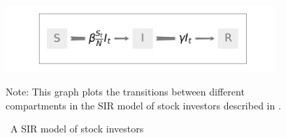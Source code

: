 	\begin{figure}[!ht] \centering  %
		\caption{ ~A SIR model of stock investors}
		\label{fig:sir_diagram}
		\centerline{\includegraphics[width=0.9\textwidth]{./figures/flow_diagram.png}}
		\begin{flushleft}
			{\footnotesize Note: This graph plots the transitions between different compartments in the SIR model of stock investors described in \cite{shiller1989survey}. }
		\end{flushleft}
	\end{figure}
